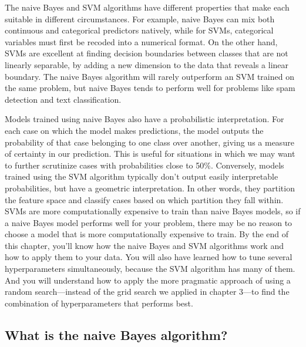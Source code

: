 \documentclass[
]{article}
\begin{document}
The naive Bayes and SVM algorithms have different properties that make
each suitable in different circumstances. For example, naive Bayes can
mix both continuous and categorical predictors natively, while for SVMs,
categorical variables must first be recoded into a numerical format. On
the other hand, SVMs are excellent at finding decision boundaries
between classes that are not linearly separable, by adding a new
dimension to the data that reveals a linear boundary. The naive Bayes
algorithm will rarely outperform an SVM trained on the same problem, but
naive Bayes tends to perform well for problems like spam detection and
text classification.

Models trained using naive Bayes also have a probabilistic
interpretation. For each case on which the model makes predictions, the
model outputs the probability of that case belonging to one class over
another, giving us a measure of certainty in our prediction. This is
useful for situations in which we may want to further scrutinize cases
with probabilities close to 50\%. Conversely, models trained using the
SVM algorithm typically don't output easily interpretable probabilities,
but have a geometric interpretation. In other words, they partition the
feature space and classify cases based on which partition they fall
within. SVMs are more computationally expensive to train than naive
Bayes models, so if a naive Bayes model performs well for your problem,
there may be no reason to choose a model that is more computationally
expensive to train. By the end of this chapter, you'll know how the
naive Bayes and SVM algorithms work and how to apply them to your data.
You will also have learned how to tune several hyperparameters
simultaneously, because the SVM algorithm has many of them. And you will
understand how to apply the more pragmatic approach of using a random
search---instead of the grid search we applied in chapter 3---to find
the combination of hyperparameters that performs best.

\subsection{What is the naive Bayes
algorithm?}\label{what-is-the-naive-bayes-algorithm}
\end{document}
